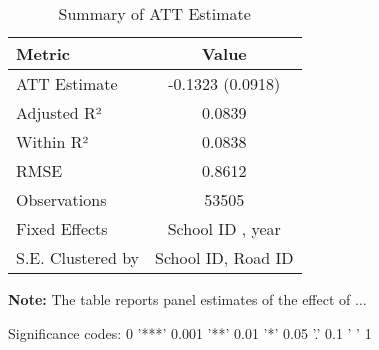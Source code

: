 \begin{table}[H]
\centering
\caption{Summary of ATT Estimate}
\label{tab:MODEL_SA_math}
 \begin{center}
 \begin{tabular}{lc}
 \toprule
Metric & Value \\
\midrule
ATT Estimate & -0.1323 (0.0918) \\
\hline 
 Adjusted R² & 0.0839 \\
Within R² & 0.0838 \\
RMSE & 0.8612 \\
Observations & 53505 \\
\hline 
 Fixed Effects & School ID ,  year \\
S.E. Clustered by & School ID, Road ID \\
\bottomrule
\end{tabular}
 \end{center}\begin{tablenotes}
\small
\item \textbf{Note:} The table reports panel estimates of the effect of ...
\item Significance codes: 0 '***' 0.001 '**' 0.01 '*' 0.05 '.' 0.1 ' ' 1
\end{tablenotes}
\end{table}